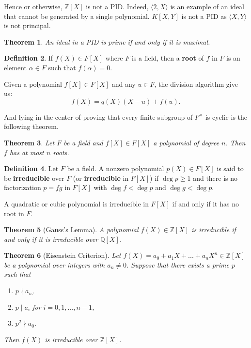 \documentclass[12pt,reqno]{amsart}
\newtheorem{thm}{Theorem}[section]
\theoremstyle{definition}
\theoremstyle{definition}
\newtheorem{defn}[thm]{Definition}
\def\ZZ{\mathbb{Z}}
\def\QQ{\mathbb{Q}}
\begin{document}
Hence or otherwise, $\ZZ[X]$ is not a PID. Indeed, $\langle 2, X\rangle$ is an example of an ideal that cannot be generated by a single polynomial. $K[X,Y]$ is not a PID as $\langle X, Y \rangle$ is not principal.

\begin{thm}
    An ideal in a PID is prime if and only if it is maximal.
\end{thm}

\smallskip

\begin{defn}
    If $f(X)\in F[X]$ where $F$ is a field, then a \textbf{root} of $f$ in $F$ is an element $\alpha\in F$ such that $f(\alpha)=0$.
\end{defn}

Given a polynomial $f[X]\in F[X]$ and any $u\in F$, the division algorithm give us: $$f(X)= q(X)(X-u)+f(u).$$

And lying in the center of proving that every finite subgroup of $F^\times$ is cyclic is the following theorem.

\begin{thm}
    Let $F$ be a field and $f[X]\in F[X]$ a polynomial of degree $n$. Then $f$ has at most $n$ roots.
\end{thm}

\begin{defn}
    Let $F$ be a field. A nonzero polynomial $p(X) \in F[X]$ is said to be \textbf{irreducible} over $F$ (or \textbf{irreducible} in $F[X]$) if $\deg p \geq 1$ and there is no factorization $p=fg$ in $F[X]$ with $\deg f < \deg p$ and $\deg g < \deg p$.
\end{defn}

A quadratic or cubic polynomial is irreducible in $F[X]$ if and only if it has no root in $F$.

\begin{thm}[Gauss's Lemma]
    A polynomial $f(X)\in \ZZ[X]$ is irreducible if and only if it is irreducible over $\QQ[X]$.
\end{thm}

\begin{thm}[Eisenstein Criterion]
    Let $f(X) = a_0+a_1X+...+a_nX^n\in \ZZ[X]$ be a polynomial over integers with $a_n\not= 0$. Suppose that there exists a prime $p$ such that \begin{enumerate}
        \item  $p\nmid a_n$, 
        \item  $p\mid a_i$  for  $i=0,1,...,n-1$,
        \item  $p^2\nmid a_0$.
    \end{enumerate}
    Then $f(X)$ is irreducible over $\ZZ[X]$.
\end{thm}
\end{document}
